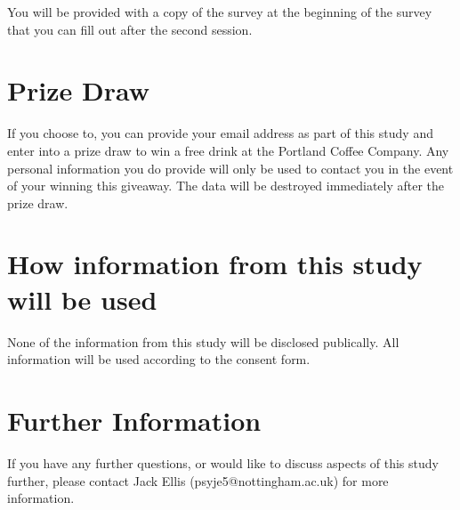 \documentclass[12pt, a4paper]{report}
\begin{document}
\par

You will be provided with a copy of the survey at the beginning of the survey that you can fill out after the second session.

\section{Prize Draw}
If you choose to, you can provide your email address as part of this study and enter into a prize draw to win a free drink at the Portland Coffee Company.
Any personal information you do provide will only be used to contact you in the event of your winning this giveaway.
The data will be destroyed immediately after the prize draw.

\section{How information from this study will be used}
None of the information from this study will be disclosed publically.
All information will be used according to the consent form.

\section{Further Information}
If you have any further questions, or would like to discuss aspects of this study further, please contact Jack Ellis (psyje5@nottingham.ac.uk) for more information.
\end{document}
